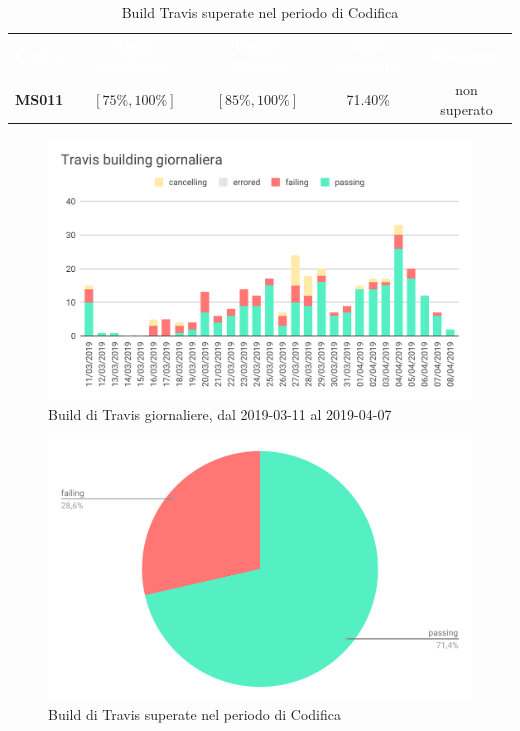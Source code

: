     \begin{table}[H]
        \centering
        \begin{tabular}{c c c c c}
        \rowcolor{greySWEight}
        \textcolor{white}{\textbf{Codice}} &
        \textcolor{white}{\textbf{Range accettabile}} &
        \textcolor{white}{\textbf{Range ottimale}} &
        \textcolor{white}{\textbf{build superate}} &
        \textcolor{white}{\textbf{Riscontro}}\\
        \textbf{MS011} & $[75\%,100\%]$ & $[85\%,100\%]$ & 71.40\% & \textcolor{RubineRed}{non superato} \\
    
        \end{tabular}
        \caption{Build Travis superate nel periodo di Codifica}
    \end{table}
    \begin{figure}[H]
        \centering
        \includegraphics[width=0.7\linewidth]{sez/App_Esito/Qualifica/graph/buildTravisGiornaliera.pdf}
        \caption{Build di Travis giornaliere, dal 2019-03-11 al 2019-04-07}
    \end{figure}
    \begin{figure}[H]
        \centering
        \includegraphics[width=0.7\linewidth]{sez/App_Esito/Qualifica/graph/buildTravisSuperate.pdf}
        \caption{Build di Travis superate nel periodo di Codifica}
    \end{figure}